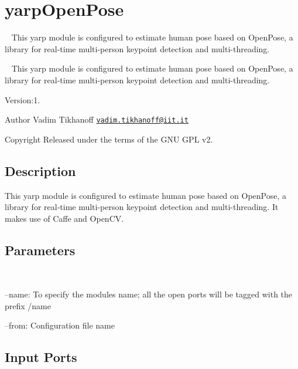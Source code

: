 \section{yarp\+Open\+Pose}
\label{group__yarpOpenPose}


~\newline
 This yarp module is configured to estimate human pose based on Open\+Pose, a library for real-\/time multi-\/person keypoint detection and multi-\/threading.  


~\newline
 This yarp module is configured to estimate human pose based on Open\+Pose, a library for real-\/time multi-\/person keypoint detection and multi-\/threading. 

Version\+:1. \begin{DoxyAuthor}{Author}
Vadim Tikhanoff \href{mailto:vadim.tikhanoff@iit.it}{\tt vadim.\+tikhanoff@iit.\+it} ~\newline
 
\end{DoxyAuthor}
\begin{DoxyCopyright}{Copyright}
Released under the terms of the G\+NU G\+PL v2. 
\end{DoxyCopyright}
\hypertarget{group__yarpOpenPose_intro_sec}{}\subsection{Description}\label{group__yarpOpenPose_intro_sec}
\begin{DoxyVerb}This yarp module is configured to estimate human pose based on OpenPose, a library for real-time multi-person keypoint detection and multi-threading. It makes use of Caffe and OpenCV.
\end{DoxyVerb}


 \hypertarget{group__yarpOpenPose_parameters_sec}{}\subsection{Parameters}\label{group__yarpOpenPose_parameters_sec}
~\newline

\begin{DoxyItemize}
\item --name\+: To specify the module\textquotesingle{}s name; all the open ports will be tagged with the prefix /name
\item --from\+: Configuration file name 
\end{DoxyItemize}\hypertarget{group__yarpOpenPose_inputports_sec}{}\subsection{Input Ports}\label{group__yarpOpenPose_inputports_sec}

